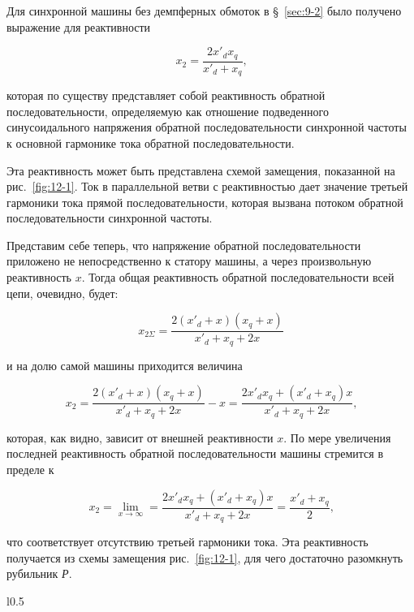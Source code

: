 Для синхронной машины без демпферных обмоток в §~\ref{sec:9-2} было получено выражение для реактивности

\begin{equation}
	x_2 = \frac{2x'_d x_q}{x'_d + x_q} \text{,}
	\label{eq:12-1}
\end{equation}

которая по существу представляет собой реактивность обратной последовательности, определяемую как отношение подведенного синусоидального напряжения обратной последовательности синхронной частоты к основной гармонике тока обратной последовательности.

Эта реактивность может быть представлена схемой замещения, показанной на рис.~\ref{fig:12-1}. Ток в параллельной ветви с реактивностью дает значение третьей гармоники тока прямой последовательности, которая вызвана потоком обратной последовательности синхронной частоты.

Представим себе теперь, что напряжение обратной последовательности приложено не непосредственно к статору машины, а через произвольную реактивность $ x $. Тогда общая реактивность обратной последовательности всей цепи, очевидно, будет:

\begin{equation*}
	x_{2\Sigma}  = \frac{2(x'_d + x) (x_q + x)}{x'_d + x_q + 2x}
\end{equation*}

и на долю самой машины приходится величина

\begin{equation*}
	x_{2}  = \frac{2(x'_d + x) (x_q + x)}{x'_d + x_q + 2x} - x = \frac{2x'_d x_q + (x'_d + x_q) x}{x'_d + x_q + 2x} \text{,}
\end{equation*}

которая, как видно, зависит от внешней реактивности $ x $. По мере увеличения последней реактивность обратной последовательности машины стремится в пределе к

\begin{equation}
	x_{2}  = \lim_{x \rightarrow \infty } = \frac{2x'_d x_q + (x'_d + x_q) x}{x'_d + x_q + 2x} = \frac{x'_d + x_q}{2} \text{,}
	\label{eq:12-2}
\end{equation}

что соответствует отсутствию третьей гармоники тока. Эта реактивность получается из схемы замещения рис.~\ref{fig:12-1}, для чего достаточно разомкнуть рубильник \textit{Р}.

\begin{wrapfigure}{l}{0.5\linewidth} %
	\centering
	
	\caption{Схема замещения, определяющая реактивность $ x_2 $ синхронной машины с учетом влияния третьей гармоники тока прямой последовательности}
	\label{fig:12-1}
\end{wrapfigure}

